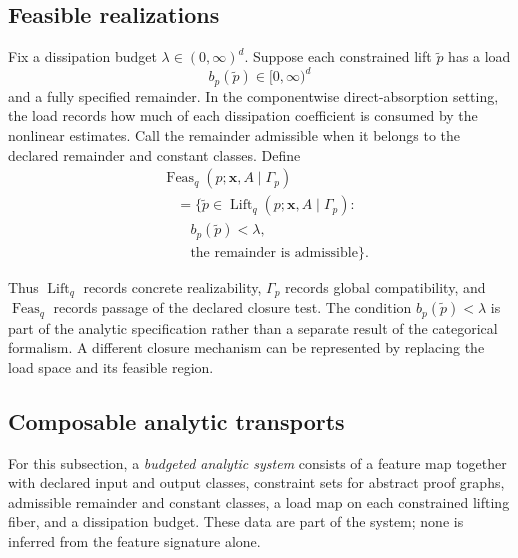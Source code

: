 \documentclass[10pt,journal,a4paper]{IEEEtran}
\theoremstyle{definition}
\begin{document}
\subsection{Feasible realizations}

Fix a dissipation budget $\lambda\in(0,\infty)^d$. Suppose each constrained lift $\widetilde p$ has a load
\[
  b_p(\widetilde p)\in[0,\infty)^d
\]
and a fully specified remainder. In the componentwise direct-absorption setting, the load records how much of each dissipation coefficient is consumed by the nonlinear estimates. Call the remainder admissible when it belongs to the declared remainder and constant classes. Define
\[
\begin{aligned}
  &\operatorname{Feas}_q(p;\mathbf x,A\mid\Gamma_p)\\
  &\quad=
  \bigl\{\widetilde p\in
  \operatorname{Lift}_q(p;\mathbf x,A\mid\Gamma_p):\\
  &\qquad b_p(\widetilde p)<\lambda,\\
  &\qquad \text{the remainder is admissible}\bigr\}.
\end{aligned}
\]

Thus $\operatorname{Lift}_q$ records concrete realizability, $\Gamma_p$ records global compatibility, and $\operatorname{Feas}_q$ records passage of the declared closure test. The condition $b_p(\widetilde p)<\lambda$ is part of the analytic specification rather than a separate result of the categorical formalism. A different closure mechanism can be represented by replacing the load space and its feasible region.

\subsection{Composable analytic transports}

For this subsection, a \emph{budgeted analytic system} consists of a feature map together with declared input and output classes, constraint sets for abstract proof graphs, admissible remainder and constant classes, a load map on each constrained lifting fiber, and a dissipation budget. These data are part of the system; none is inferred from the feature signature alone.
\end{document}
